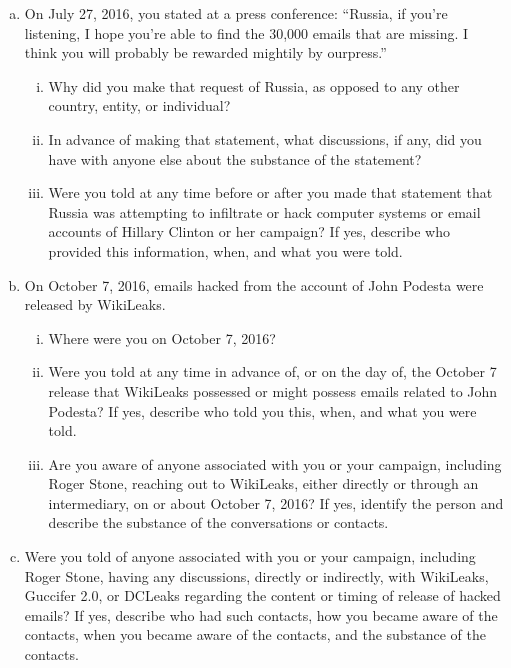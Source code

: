 \begin{enumerate}[a.]
\item On July 27, 2016, you stated at a press conference: “Russia, if you’re listening, I hope you’re able to find the 30,000 emails that are missing.
I think you will probably be rewarded mightily by ourpress.”

\begin{enumerate}[i.]

\item Why did you make that request of Russia, as opposed to any other country, entity, or individual?

\item In advance of making that statement, what discussions, if any, did you have with anyone else about the substance of the statement?

\item Were you told at any time before or after you made that statement that Russia was attempting to infiltrate or hack computer systems or email accounts of Hillary Clinton or her campaign?
If yes, describe who provided this information, when, and what you were told.

\end{enumerate}

\item On October 7, 2016, emails hacked from the account of John Podesta were released by WikiLeaks.

\begin{enumerate}[i.]

\item Where were you on October 7, 2016?

\item Were you told at any time in advance of, or on the day of, the October 7 release that WikiLeaks possessed or might possess emails related to John Podesta?
If yes, describe who told you this, when, and what you were told.

\item Are you aware of anyone associated with you or your campaign, including Roger Stone, reaching out to WikiLeaks, either directly or through an intermediary, on or about October 7, 2016?
If yes, identify the person and describe the substance of the conversations or contacts.

\end{enumerate}

\item Were you told of anyone associated with you or your campaign, including Roger Stone, having any discussions, directly or indirectly, with WikiLeaks, Guccifer 2.0, or DCLeaks regarding the content or timing of release of hacked emails?
If yes, describe who had such contacts, how you became aware of the contacts, when you became aware of the contacts, and the substance of the contacts.


\end{enumerate}
